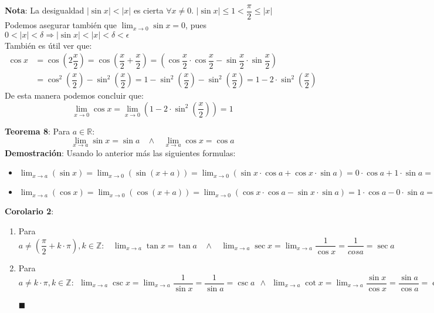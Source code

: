 \documentclass[11pt,a4paper]{article}
\newcommand*{\QEDA}{\null\nobreak\hfill\ensuremath{\blacksquare}}
\begin{document}
\noindent \textbf{Nota}: La desigualdad $|\sin x| < |x|$ es cierta $\forall x \not = 0$. $|\sin x| \leq 1 < \dfrac{\pi}{2} \leq |x|$\\

\noindent Podemos asegurar tambi\'en que $\displaystyle{\lim_{x\to 0} \sin x} = 0$, pues $0<|x|<\delta \Rightarrow |\sin x| < |x| < \delta < \epsilon$\\

\noindent Tambi\'en es \'util ver que:
\begin{align*}
\cos x &= \cos \left(2\dfrac{x}{2}\right) = \cos\left(\dfrac{x}{2} + \dfrac{x}{2}\right) = \left(\cos \dfrac{x}{2} \cdot \cos \dfrac{x}{2} - \sin \dfrac{x}{2} \cdot \sin \dfrac{x}{2}\right)\\
& = \cos^2 \left(\dfrac{x}{2}\right) - \sin^2 \left(\dfrac{x}{2}\right) = 1 - \sin^2 \left(\dfrac{x}{2}\right) - \sin^2 \left(\dfrac{x}{2}\right) = 1 - 2\cdot \sin^2 \left(\dfrac{x}{2}\right)
\end{align*}
De esta manera podemos concluir que:
$$\lim_{x\to 0}\cos x = \lim_{x\to 0}\left(1 - 2\cdot \sin^2 \left(\dfrac{x}{2}\right)\right) = 1$$

\noindent \textbf{Teorema 8}: Para $a \in \mathbb{R}$:
$$\lim_{x\to a}\sin x = \sin a \ \ \ \ \land \ \ \ \ \lim_{x\to a}\cos x = \cos a$$
\noindent \textbf{Demostraci\'on}: Usando lo anterior m\'as las siguientes formulas:
\begin{itemize}
\item $\displaystyle{\lim_{x\to a}(\sin x) = \lim_{x\to 0} (\sin(x+a)) = \lim_{x\to 0} (\sin x \cdot \cos a + \cos x \cdot \sin a) = 0 \cdot \cos a + 1 \cdot \sin a = \sin a}$
\item $\displaystyle{\lim_{x\to a}(\cos x) = \lim_{x\to 0} (\cos(x+a)) = \lim_{x\to 0} (\cos x \cdot \cos a - \sin x \cdot \sin a) = 1 \cdot \cos a - 0 \cdot \sin a = \cos a}$
\end{itemize}

\noindent \textbf{Corolario 2}: 
\begin{enumerate}
\item Para $a \not = \left(\dfrac{\pi}{2} + k\cdot \pi\right), k \in \mathbb{Z} : \ \ \ \ \displaystyle{\lim_{x\to a} \tan x = \tan a \ \ \ \ \land \ \ \ \ \lim_{x\to a}\sec x = \lim_{x\to a}\dfrac{1}{\cos x} = \dfrac{1}{cos a} = \sec a}$
\item Para $a \not = k\cdot \pi, k \in \mathbb{Z} : \ \ \displaystyle{\lim_{x\to a}\csc x = \lim_{x\to a}\dfrac{1}{\sin x} = \dfrac{1}{\sin a} = \csc a \ \ \land \ \ \lim_{x\to a}\cot x = \lim_{x\to a}\dfrac{\sin x}{\cos x} = \dfrac{\sin a}{\cos a} = \cot a}$\\ \\
\QEDA
\end{enumerate}
\end{document}
